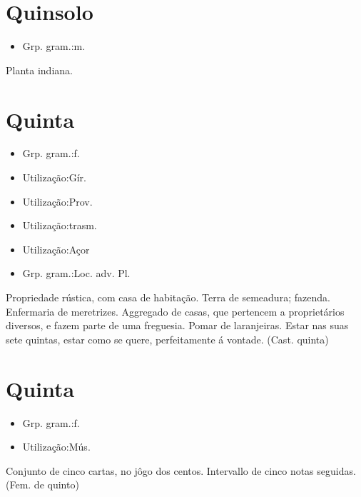 \section{Quinsolo}
\begin{itemize}
\item {Grp. gram.:m.}
\end{itemize}
Planta indiana.
\section{Quinta}
\begin{itemize}
\item {Grp. gram.:f.}
\end{itemize}
\begin{itemize}
\item {Utilização:Gír.}
\end{itemize}
\begin{itemize}
\item {Utilização:Prov.}
\end{itemize}
\begin{itemize}
\item {Utilização:trasm.}
\end{itemize}
\begin{itemize}
\item {Utilização:Açor}
\end{itemize}
\begin{itemize}
\item {Grp. gram.:Loc. adv. Pl.}
\end{itemize}
Propriedade rústica, com casa de habitação.
Terra de semeadura; fazenda.
Enfermaria de meretrizes.
Aggregado de casas, que pertencem a proprietários diversos, e fazem parte de uma freguesia.
Pomar de laranjeiras.
\textunderscore Estar nas suas sete quintas\textunderscore , estar como se quere, perfeitamente á vontade.
(Cast. \textunderscore quinta\textunderscore )
\section{Quinta}
\begin{itemize}
\item {Grp. gram.:f.}
\end{itemize}
\begin{itemize}
\item {Utilização:Mús.}
\end{itemize}
Conjunto de cinco cartas, no jôgo dos centos.
Intervallo de cinco notas seguidas.
(Fem. de \textunderscore quinto\textunderscore )
